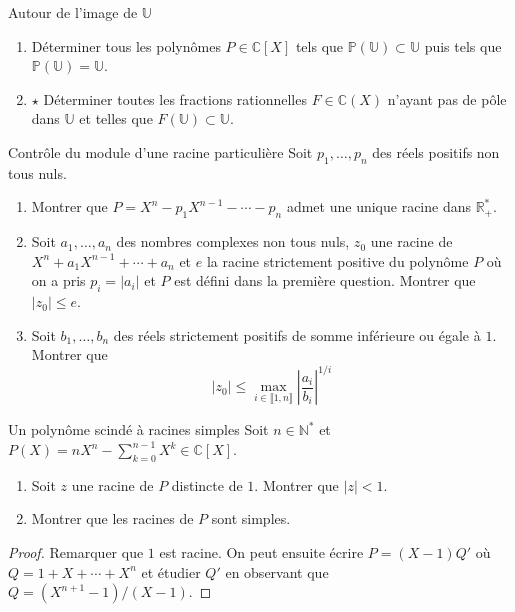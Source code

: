 \documentclass[french,a4paper]{article}
\renewcommand{\P}{\mathbb{P}}
\newcommand{\N}{\mathbb{N}}
\newcommand{\R}{\mathbb{R}}
\newcommand{\C}{\mathbb{C}}
\newcommand{\U}{\mathbb{U}}
\newcommand{\st}{^*}
\theoremstyle{plain}
\theoremstyle{definition}
\theoremstyle{remark}
\begin{document}
\begin{ex}{Autour de l'image de $\U$}
	\begin{enumerate}
		\item Déterminer tous les polynômes $P\in\C[X]$ tels que $\P(\U)\subset\U$ puis tels que $\P(\U)=\U$.
		\item $\star$ Déterminer toutes les fractions rationnelles $F\in\C(X)$ n'ayant pas de pôle dans $\U$ et telles que $F(\U)\subset\U$.
	\end{enumerate}
\end{ex}

\begin{ex}{Contrôle du module d'une racine particulière}
	Soit $p_1,\ldots,p_n$ des réels positifs non tous nuls.
	\begin{enumerate}
		\item Montrer que $P=X^n-p_1X^{n-1}-\cdots-p_n$ admet une unique racine dans $\R_+\st$.
		\item Soit $a_1,\ldots,a_n$ des nombres complexes non tous nuls, $z_0$ une racine de $X^n+a_1X^{n-1}+\cdots+a_n$ et $e$ la racine strictement positive du polynôme $P$ où on a pris $p_i=\lvert a_i\rvert$ et $P$ est défini dans la première question. Montrer que $\lvert z_0\rvert\leqslant e$.
		\item Soit $b_1,\ldots,b_n$ des réels strictement positifs de somme inférieure ou égale à $1$. Montrer que $$\lvert z_0\rvert\leqslant\max_{i\in\llbracket1,n\rrbracket}\left\lvert\frac{a_i}{b_i}\right\rvert^{1/i}$$
	\end{enumerate}
\end{ex}

\begin{ex}{Un polynôme scindé à racines simples}
	Soit $n\in\N\st$ et $P(X)=nX^n-\displaystyle\sum_{k=0}^{n-1}X^k\in\C[X]$.
	\begin{enumerate}
		\item Soit $z$ une racine de $P$ distincte de $1$. Montrer que $\lvert z\rvert <1$.
		\item Montrer que les racines de $P$ sont simples.
	\end{enumerate}
\end{ex}
\begin{proof}
	Remarquer que $1$ est racine. On peut ensuite écrire $P=(X-1)Q'$ où $Q=1+X+\cdots+X^n$ et étudier $Q'$ en observant que $Q=(X^{n+1}-1)/(X-1)$.
\end{proof}
\end{document}
